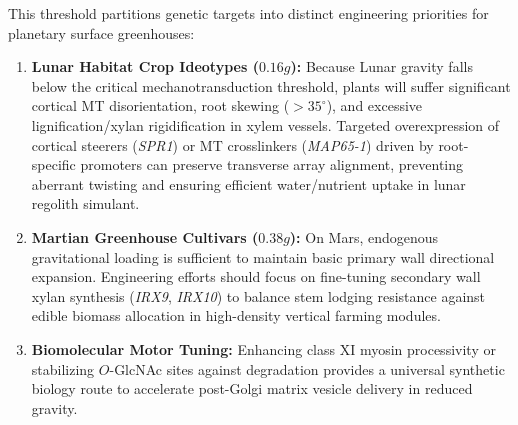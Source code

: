 This threshold partitions genetic targets into distinct engineering priorities for planetary surface greenhouses:
\begin{enumerate}
    \item \textbf{Lunar Habitat Crop Ideotypes ($0.16g$):} Because Lunar gravity falls below the critical mechanotransduction threshold, plants will suffer significant cortical MT disorientation, root skewing ($>35^\circ$), and excessive lignification/xylan rigidification in xylem vessels. Targeted overexpression of cortical steerers (\textit{SPR1}) or MT crosslinkers (\textit{MAP65-1}) driven by root-specific promoters can preserve transverse array alignment, preventing aberrant twisting and ensuring efficient water/nutrient uptake in lunar regolith simulant.
    \item \textbf{Martian Greenhouse Cultivars ($0.38g$):} On Mars, endogenous gravitational loading is sufficient to maintain basic primary wall directional expansion. Engineering efforts should focus on fine-tuning secondary wall xylan synthesis (\textit{IRX9}, \textit{IRX10}) to balance stem lodging resistance against edible biomass allocation in high-density vertical farming modules.
    \item \textbf{Biomolecular Motor Tuning:} Enhancing class XI myosin processivity or stabilizing $O$-GlcNAc sites against degradation provides a universal synthetic biology route to accelerate post-Golgi matrix vesicle delivery in reduced gravity.
\end{enumerate}
